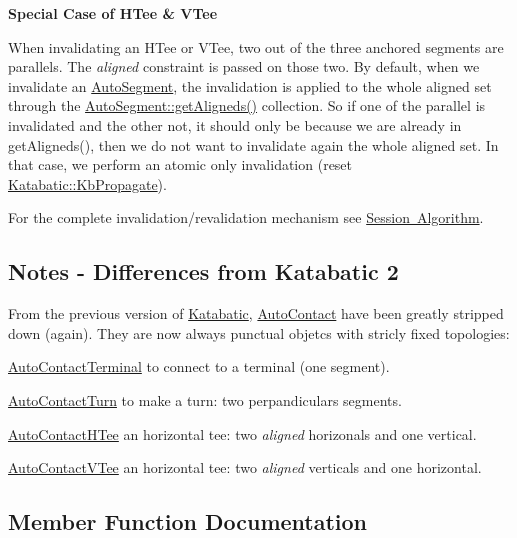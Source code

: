{\bfseries Special Case of H\+Tee \& V\+Tee}

When invalidating an H\+Tee or V\+Tee, two out of the three anchored segments are parallels. The {\itshape aligned} constraint is passed on those two. By default, when we invalidate an \mbox{\hyperlink{classKatabatic_1_1AutoSegment}{Auto\+Segment}}, the invalidation is applied to the whole aligned set through the \mbox{\hyperlink{classKatabatic_1_1AutoSegment_aaca749f49cd03ca06449d5ea2104033a}{Auto\+Segment\+::get\+Aligneds()}} collection. So if one of the parallel is invalidated and the other not, it should only be because we are already in {\ttfamily get\+Aligneds()}, then we do not want to invalidate again the whole aligned set. In that case, we perform an atomic only invalidation (reset \mbox{\hyperlink{namespaceKatabatic_a2af2ad6b6441614038caf59d04b3b217a3f95c1f06fe0b58b44ccbc57d99f2a5d}{Katabatic\+::\+Kb\+Propagate}}).

For the complete invalidation/revalidation mechanism see \mbox{\hyperlink{classKatabatic_1_1Session_secSessionAlgo}{Session Algorithm}}.\hypertarget{classKatabatic_1_1AutoContact_secDiffFromKatabatic2}{}\subsection{Notes -\/ Differences from Katabatic 2}\label{classKatabatic_1_1AutoContact_secDiffFromKatabatic2}
From the previous version of \mbox{\hyperlink{namespaceKatabatic}{Katabatic}}, \mbox{\hyperlink{classKatabatic_1_1AutoContact}{Auto\+Contact}} have been greatly stripped down (again). They are now always punctual objetcs with stricly fixed topologies\+: 
\begin{DoxyItemize}
\item \mbox{\hyperlink{classKatabatic_1_1AutoContactTerminal}{Auto\+Contact\+Terminal}} to connect to a terminal (one segment). 
\item \mbox{\hyperlink{classKatabatic_1_1AutoContactTurn}{Auto\+Contact\+Turn}} to make a turn\+: two perpandiculars segments. 
\item \mbox{\hyperlink{classKatabatic_1_1AutoContactHTee}{Auto\+Contact\+H\+Tee}} an horizontal tee\+: two {\itshape aligned} horizonals and one vertical. 
\item \mbox{\hyperlink{classKatabatic_1_1AutoContactVTee}{Auto\+Contact\+V\+Tee}} an horizontal tee\+: two {\itshape aligned} verticals and one horizontal. 
\end{DoxyItemize}

\subsection{Member Function Documentation}
\mbox{\label{classKatabatic_1_1AutoContact_a4092778435abf3fb25a986a802bdb6c6}} 
